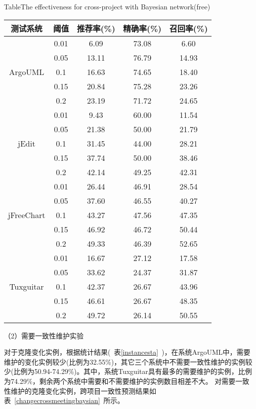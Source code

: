 \begin{table}[htbp]
{Table$\!$}{The effectiveness for cross-project with Bayesian network(free)}
\vspace{0.5em}
\centering
\wuhao
\begin{tabular}{ccccc}
\toprule[1.5pt]
{测试系统}&{阈值}&{推荐率(\%)}&{精确率(\%)}&{召回率(\%)}\\
\midrule[1pt]
\multirow{5}{*}{ArgoUML}
&0.01&	6.09&	73.08&	6.60\\
&0.05&	13.11&	76.79&	14.93\\
&0.1&	16.63&	74.65&	18.40\\
&0.15&	20.84&	75.28&	23.26\\
&0.2&	23.19&	71.72&	24.65\\
\hline
\multirow{5}{*}{jEdit}
&0.01&	9.43&	60.00&	11.54\\
&0.05&	21.38&	50.00&	21.79\\
&0.1&	31.45&	44.00&	28.21\\
&0.15&	37.74&	50.00&	38.46\\
&0.2&	42.14&	49.25&	42.31\\
\hline
\multirow{5}{*}{jFreeChart}
&0.01&	26.44&	46.91&	28.54\\
&0.05&	37.60&	46.55&	40.27\\
&0.1&	43.27&	47.56&	47.35\\
&0.15&	46.92&	46.72&	50.44\\
&0.2&	49.33&	46.39&	52.65\\
\hline
\multirow{5}{*}{Tuxguitar}
&0.01&	16.67&	27.12&	17.58\\
&0.05&	33.62&	24.37&	31.87\\
&0.1&	42.37&	26.67&	43.96\\
&0.15&	46.61&	26.67&	48.35\\
&0.2&	49.72&	26.14&	50.55\\
\bottomrule[1.5pt]
\end{tabular}
\end{table}

（2）需要一致性维护实验

对于克隆变化实例，根据统计结果(~表\ref{instancesta}~)，在系统ArgoUML中，需要维护的变化实例较少(比例为32.55\%)，其它三个系统中不需要一致性维护的实例较少(比例为50.94-74.29\%)。其中，系统Tuxguitar具有最多的需要维护的实例，比例为74.29\%，剩余两个系统中需要和不需要维护的实例数目相差不大。
对需要一致性维护的克隆变化实例，跨项目一致性预测结果如表~\ref{changecrossmeetingbaysian}~所示。

